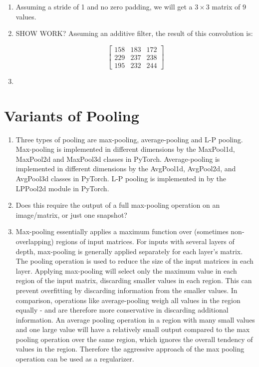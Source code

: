 \documentclass[a4paper]{article}
\begin{document}
\begin{enumerate}
\item{Assuming a stride of 1 and no zero padding, we will get a $3 \times 3$ matrix of $9$ values.}
\item{SHOW WORK?
\newline
\newline
Assuming an additive filter, the result of this convolution is:

$$
\begin{bmatrix}
158 & 183 & 172 \\
229 & 237 & 238 \\
195 & 232 & 244 
\end{bmatrix}
$$

 }
\item{}
\end{enumerate}

\section{Variants of Pooling}
\begin{enumerate}
\item{Three types of pooling are max-pooling, average-pooling and L-P pooling. Max-pooling is implemented in different dimensions by the MaxPool1d, MaxPool2d and MaxPool3d classes in PyTorch. Average-pooling is implemented in different dimensions by the AvgPool1d, AvgPool2d, and AvgPool3d classes in PyTorch. L-P pooling is implemented in by the LPPool2d module in PyTorch. }
\item{ Does this require the output of a full max-pooling operation on an image/matrix, or just one snapshot? }
\item{ Max-pooling essentially applies a maximum function over (sometimes non-overlapping) regions of input matrices. For inputs with several layers of depth, max-pooling is generally applied separately for each layer's matrix. The pooling operation is used to reduce the size of the input matrices in each layer. Applying max-pooling will select only the maximum value in each region of the input matrix, discarding smaller values in each region. This can prevent overfitting by discarding information from the smaller values. In comparison, operations like average-pooling weigh all values in the region equally - and are therefore more conservative in discarding additional information. An average pooling operation in a region with many small values and one large value will have a relatively small output compared to the max pooling operation over the same region, which ignores the overall tendency of values in the region. Therefore the aggressive approach of the max pooling operation can be used as a regularizer. 
}
\end{enumerate}
\end{document}

